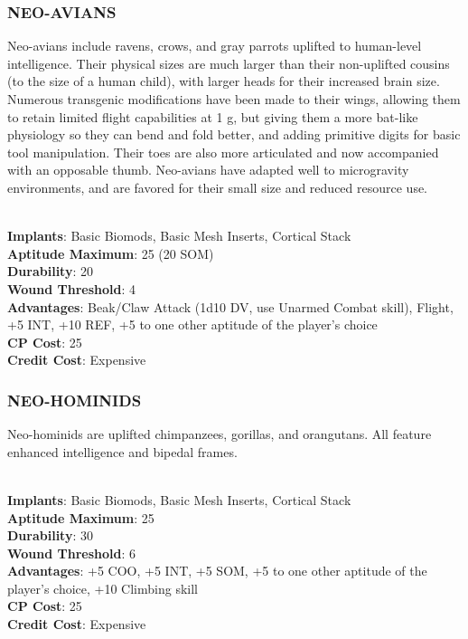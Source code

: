 \subsubsection{NEO-AVIANS}
Neo-avians include ravens, crows, and gray parrots uplifted to human-level
intelligence. Their physical sizes are much larger than their non-uplifted
cousins (to the size of a human child), with larger heads for their increased
brain size. Numerous transgenic modifications have been made to their wings,
allowing them to retain limited flight capabilities at 1 g, but giving them a
more bat-like physiology so they can bend and fold better, and adding primitive
digits for basic tool manipulation. Their toes are also more articulated and
now accompanied with an opposable thumb. Neo-avians have adapted well to
microgravity environments, and are favored for their small size and reduced
resource use.

\\ \textbf{Implants}: Basic Biomods, Basic Mesh Inserts, Cortical Stack
\\ \textbf{Aptitude Maximum}: 25 (20 SOM)
\\ \textbf{Durability}: 20
\\ \textbf{Wound Threshold}: 4
\\ \textbf{Advantages}: Beak/Claw Attack (1d10 DV, use Unarmed Combat skill), Flight, +5 INT, +10 REF, +5 to one other aptitude of the player’s choice
\\ \textbf{CP Cost}: 25
\\ \textbf{Credit Cost}: Expensive

\subsubsection{NEO-HOMINIDS}
Neo-hominids are uplifted chimpanzees, gorillas, and orangutans. All feature
enhanced intelligence and bipedal frames.

\\ \textbf{Implants}: Basic Biomods, Basic Mesh Inserts, Cortical Stack
\\ \textbf{Aptitude Maximum}: 25
\\ \textbf{Durability}: 30
\\ \textbf{Wound Threshold}: 6
\\ \textbf{Advantages}: +5 COO, +5 INT, +5 SOM, +5 to one other aptitude of the player’s choice, +10 Climbing skill
\\ \textbf{CP Cost}: 25
\\ \textbf{Credit Cost}: Expensive

